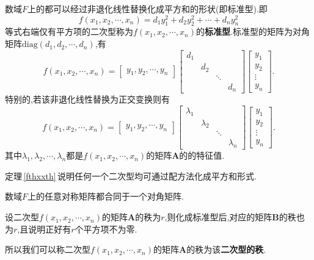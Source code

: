 \documentclass[9pt,a4paper]{book}
\begin{document}
\begin{theorem}\label{fthxxth}
	数域$ F $上的都可以经过非退化线性替换化成平方和的形状(即标准型).即
	\[  f( x_1,x_2,\cdots,x_n )=d_1y_1^2+d_2y_2^2+\cdots+d_ny_n^2 \]等式右端仅有平方项的二次型称为$ f( x_1,x_2,\cdots,x_n ) $的\textbf{标准型}.标准型的矩阵为对角矩阵$ \mathrm{diag}(d_1,d_2,\cdots,d_n) $,有
	\[  f( x_1,x_2,\cdots,x_n )=\begin{bmatrix}
	y_1,y_2,\cdots,y_n
	\end{bmatrix}
	\begin{bmatrix}
	d_1&&&\\
	&d_2&&\\
	&&\ddots&\\
	&&&d_n
	\end{bmatrix}\begin{bmatrix}
	y_1\\y_2\\\vdots\\y_n
	\end{bmatrix} .\]
	特别的,若该非退化线性替换为正交变换则有
		\[  f( x_1,x_2,\cdots,x_n )=\begin{bmatrix}
	y_1,y_2,\cdots,y_n
	\end{bmatrix}
	\begin{bmatrix}
	\lambda_1&&&\\
	&\lambda_2&&\\
	&&\ddots&\\
	&&&\lambda_n
	\end{bmatrix}\begin{bmatrix}
	y_1\\y_2\\\vdots\\y_n
	\end{bmatrix} .\]
	其中$ \lambda_1,\lambda_2,\cdots,\lambda_n $都是$ f( x_1,x_2,\cdots,x_n ) $的矩阵$ \bm{A} $的的特征值.
\end{theorem}

定理\,\ref{fthxxth}\,说明任何一个二次型均可通过配方法化成平方和形式.
\begin{inference}
	数域$ F $上的任意对称矩阵都合同于一个对角矩阵.
\end{inference}
\begin{theorem}
	设二次型$f(x_{1},x_{2},\cdots,x_{n})$的矩阵$ \bm{A} $的秩为$ r $,则化成标准型后,对应的矩阵$ \bm{B} $的秩也为$ r $,且说明正好有$ r $个平方项不为零.
	
	所以我们可以称二次型$f(x_{1},x_{2},\cdots,x_{n})$的矩阵$ \bm{A} $的秩为该\textbf{二次型的秩}.
\end{theorem}
\end{document}
